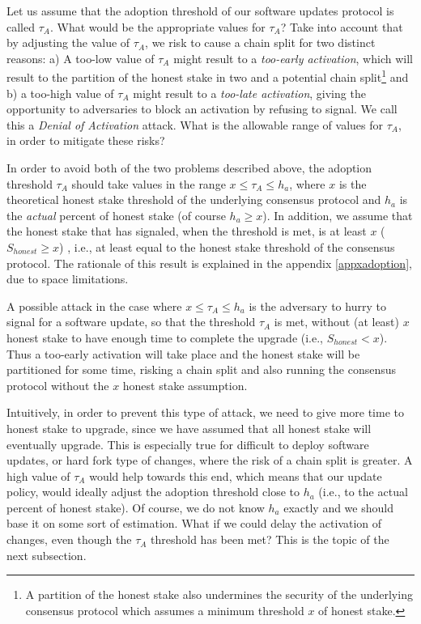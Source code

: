 Let us assume that the adoption threshold of our software updates protocol is called $\tau_A$. %
What would be the appropriate values for $\tau_A$? Take into account that by adjusting the value of $\tau_A$, we risk to cause a chain split for two distinct reasons: a) A too-low value of $\tau_A$ might result to a \emph{too-early activation}, which will result to the partition of the honest stake in two and a potential chain split\footnote{A partition of the honest stake also undermines the security of the underlying consensus protocol which assumes a minimum threshold $x$ of honest stake.}  and b) a too-high value of $\tau_A$ might result to a \emph{too-late activation}, giving the opportunity to adversaries to block an activation by refusing to signal. We call this a \emph{Denial of Activation} attack. %
What is the allowable range of values for $\tau_A$, in order to mitigate these risks?

In order to avoid both of the two problems described above, the adoption threshold $\tau_A$ should take values in the range $x \leq \tau_A \leq h_a$, where $x$ is the theoretical honest stake threshold of the underlying consensus protocol and $h_a$ is the \emph{actual} percent of honest stake (of course $h_a \geq x$). In addition, we assume that the honest stake that has signaled, when the threshold is met, is at least $x$ ($S_{honest} \geq x$) , i.e., at least equal to the honest stake threshold of the consensus protocol. The rationale of this result is explained in the appendix \ref{appxadoption}, due to space limitations.

A possible attack in the case where $x \leq \tau_A \leq h_a$ is the adversary to hurry to signal for a software update, so that the threshold $\tau_A$ is met, without (at least) $x$ honest stake to have enough time to complete the upgrade (i.e., $S_{honest} < x$). Thus a too-early activation will take place and the honest stake will be partitioned for some time, risking a chain split and also running the consensus protocol without the $x$ honest stake assumption.

Intuitively, in order to prevent this type of attack, we need to give more time to honest stake to upgrade, since we have assumed that all honest stake will eventually upgrade. This is especially true for difficult to deploy software updates, or hard fork type of changes, where the risk of a chain split is greater. A high value of $\tau_A$ would help towards this end, which means that our update policy, would ideally adjust the adoption threshold close to $h_a$ (i.e., to the actual percent of honest stake). Of course, we do not know $h_a$ exactly and we should base it on some sort of estimation. What if we could delay the activation of changes, even though the $\tau_A$ threshold has been met? This is the topic of the next subsection. 

